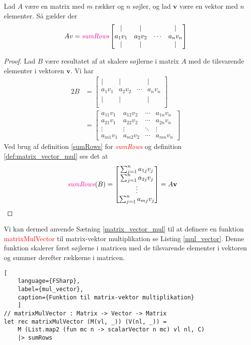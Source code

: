 \begin{theorem} \label{matrix_vector_mul}
    Lad $A$ være en matrix med $m$ rækker og $n$ søjler, og lad $\mathbf{v}$ være en vektor med $n$ elementer. Så gælder der
    \[ Av = \textit{\textcolor{red}{sumRows}}
    \begin{bmatrix}
        | & | &        & | \\
        a_{1}v_{1} & a_{2}v_{2} & \cdots & a_{n}v_{n} \\
        | & | &        & | \\
    \end{bmatrix}
    \]
\end{theorem}
\begin{proof}
    Lad $B$ være resultatet af at skalere søjlerne i matrix $A$ med de tilsvarende elementer i vektoren $\mathbf{v}$. Vi har
    \begin{alignat*}{2}
    B &= \begin{bmatrix}
        | & | &        & | \\
        a_{1}v_{1} & a_{2}v_{2} & \cdots & a_{n}v_{n} \\
        | & | &        & | \\
    \end{bmatrix} \\
    &= \begin{bmatrix}
        a_{11}v_{1} & a_{12}v_{2} & \cdots & a_{1n}v_{n} \\
        a_{21}v_{1} & a_{22}v_{2} & \cdots & a_{2n}v_{n} \\
        \vdots & \vdots & \ddots & \vdots \\
        a_{m1}v_{1} & a_{m2}v_{2} & \cdots & a_{mn}v_{n}
    \end{bmatrix}
    \end{alignat*}
    Ved brug af definition \ref{sumRows} for \textit{\textcolor{red}{sumRows}} og definition \ref{def:matrix_vector_mul} ses det at 
    \begin{alignat*}{2}
    \text{{\color{red}\textit{sumRows}}}(B) &= \begin{bmatrix}
        \sum_{j=1}^{n} a_{1j}v_{j} \\
        \sum_{j=1}^{n} a_{2j}v_{j} \\
        \vdots \\
        \sum_{j=1}^{n} a_{mj}v_{j}
    \end{bmatrix} = A\mathbf{v}
    \end{alignat*}
\end{proof}
Vi kan dermed anvende Sætning \ref{matrix_vector_mul} til at definere en funktion \textcolor{red}{matrixMulVector} til matrix-vektor multiplikation se Listing \ref{mul_vector}. Denne funktion skalerer først søjlerne i matricen med de tilsvarende elementer i vektoren og summer derefter rækkerne i matricen.
\begin{lstlisting}[
    language={FSharp}, 
    label={mul_vector}, 
    caption={Funktion til matrix-vektor multiplikation}
    ]
// matrixMulVector : Matrix -> Vector -> Matrix
let rec matrixMulVector (M(vl, _)) (V(nl, _)) =
    M (List.map2 (fun mc n -> scalarVector n mc) vl nl, C) 
    |> sumRows
\end{lstlisting}

